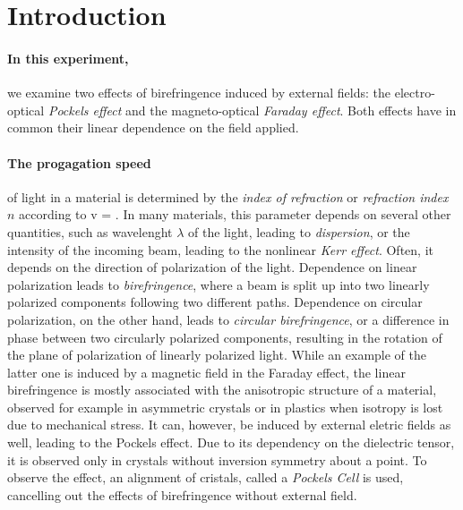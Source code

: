 \section{Introduction}
\paragraph{In this experiment,} we examine two effects of 
birefringence induced by 
external fields: the electro-optical \emph{Pockels effect} and 
the magneto-optical \emph{Faraday effect}. 
Both effects have in common their linear dependence on the 
field applied. 

\paragraph{The progagation speed} of light in a material is determined 
by the \emph{index of refraction} or 
\emph{refraction index} $n$ according to 
\beqn
   v = .
\eeqn
In many materials, this parameter depends on several other quantities, 
such as wavelenght $\lambda$ of the light, leading to \emph{dispersion}, 
or the intensity of the incoming beam, leading to the nonlinear 
\emph{Kerr effect}. Often, it depends on the direction of polarization 
of the light. Dependence on linear polarization leads to \emph{birefringence}, 
where a beam is split up into two linearly polarized 
components following two different paths.  
Dependence on circular polarization, on the other hand, leads to 
\emph{circular birefringence}, 
or a difference in phase between two circularly polarized components, 
resulting in the rotation of the plane of polarization of linearly 
polarized light.
While an example of the latter one is induced by a magnetic field in the 
Faraday effect, 
the linear birefringence is mostly associated with the anisotropic structure 
of a material, observed for example in asymmetric crystals or in plastics 
when isotropy is lost due to mechanical stress. It can, however, be induced 
by external eletric fields as well, leading to the 
Pockels effect. Due to its dependency on the dielectric tensor, it 
is observed only in crystals without inversion symmetry about a point. 
To observe the effect, an alignment of cristals, called a 
\emph{Pockels Cell} is used, cancelling out the effects of birefringence 
without external field. 

